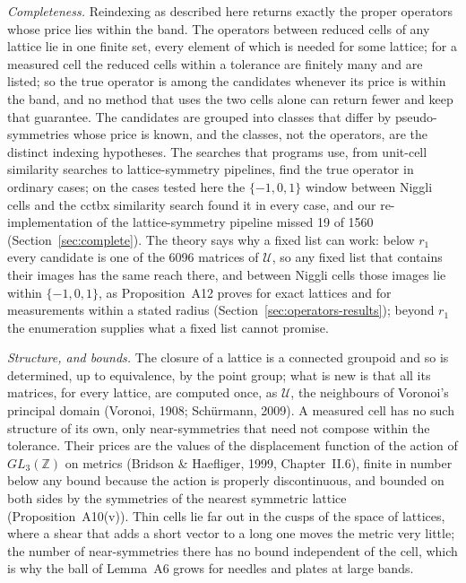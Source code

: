 \emph{Completeness.} Reindexing as described here returns exactly the proper operators whose price lies within the band. The operators between reduced cells of any lattice lie in one finite set, every element of which is needed for some lattice; for a measured cell the reduced cells within a tolerance are finitely many and are listed; so the true operator is among the candidates whenever its price is within the band, and no method that uses the two cells alone can return fewer and keep that guarantee. The candidates are grouped into classes that differ by pseudo-symmetries whose price is known, and the classes, not the operators, are the distinct indexing hypotheses. The searches that programs use, from unit-cell similarity searches to lattice-symmetry pipelines, find the true operator in ordinary cases; on the cases tested here the $\{-1,0,1\}$ window between Niggli cells and the cctbx similarity search found it in every case, and our re-implementation of the lattice-symmetry pipeline missed 19 of 1560 (Section~\ref{sec:complete}). The theory says why a fixed list can work: below $r_1$ every candidate is one of the 6096 matrices of $\mathcal U$, so any fixed list that contains their images has the same reach there, and between Niggli cells those images lie within $\{-1,0,1\}$, as Proposition~A12 proves for exact lattices and for measurements within a stated radius (Section~\ref{sec:operators-results}); beyond $r_1$ the enumeration supplies what a fixed list cannot promise.

\emph{Structure, and bounds.} The closure of a lattice is a connected groupoid and so is determined, up to equivalence, by the point group; what is new is that all its matrices, for every lattice, are computed once, as $\mathcal U$, the neighbours of Voronoi's principal domain (Voronoi, 1908; Sch\"urmann, 2009). A measured cell has no such structure of its own, only near-symmetries that need not compose within the tolerance. Their prices are the values of the displacement function of the action of $GL_3(\mathbb Z)$ on metrics (Bridson \& Haefliger, 1999, Chapter~II.6), finite in number below any bound because the action is properly discontinuous, and bounded on both sides by the symmetries of the nearest symmetric lattice (Proposition~A10(v)). Thin cells lie far out in the cusps of the space of lattices, where a shear that adds a short vector to a long one moves the metric very little; the number of near-symmetries there has no bound independent of the cell, which is why the ball of Lemma~A6 grows for needles and plates at large bands.

